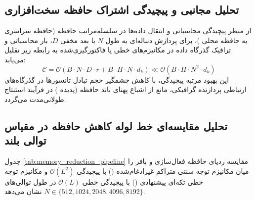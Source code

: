 \documentclass[12pt,a4paper]{report}
\theoremstyle{definition}
\begin{document}
\subsection{تحلیل مجانبی و پیچیدگی اشتراک حافظه سخت‌افزاری}
از منظر پیچیدگی محاسباتی و انتقال داده‌ها در سلسله‌مراتب حافظه (حافظه سراسری  به حافظه محلی )، برای پردازش دنباله‌ای به طول $N$ با بعد مخفی $D$، بار محاسباتی و ترافیک گذرگاه داده در مکانیزم‌های خطی یا فاکتورگیری‌شده به رابطه زیر تقلیل می‌یابد:
\begin{equation}
\label{eq:complexity_general}
\mathcal{C} = \mathcal{O}\left( B \cdot N \cdot D \cdot r + B \cdot H \cdot N \cdot d_k \right) \ll \mathcal{O}\left( B \cdot H \cdot N^2 \cdot d_k \right)
\end{equation}
این بهبود مرتبه پیچیدگی، با کاهش چشمگیر حجم تبادل تانسورها در گذرگاه‌های ارتباطی پردازنده گرافیکی، مانع از اشباع پهنای باند حافظه (پدیده ) در فرآیند استنتاج طولانی‌مدت می‌گردد.

\subsection{تحلیل مقایسه‌ای خط لوله کاهش حافظه در مقیاس توالی بلند}
جدول \ref{tab:memory_reduction_pipeline} مقایسه ردپای حافظه فعال‌سازی و بافر  را میان مکانیزم توجه سنتی متراکم غیرادغام‌شده () با پیچیدگی $\mathcal{O}(L^2)$ و مکانیزم توجه خطی تکه‌ای پیشنهادی () با پیچیدگی خطی $\mathcal{O}(L)$ در طول توالی‌های $N \in \{512, 1024, 2048, 4096, 8192\}$ نشان می‌دهد.
\end{document}
